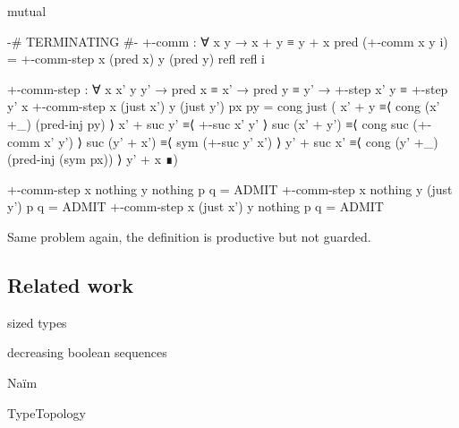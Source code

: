 \begin{code}[hide]
mutual
\end{code}
\begin{code}
  {-# TERMINATING #-}
  +-comm : ∀ x y → x + y ≡ y + x
  pred (+-comm x y i) =
    +-comm-step x (pred x) y (pred y) refl refl i

  +-comm-step :
    ∀ x x' y y' → pred x ≡ x' → pred y ≡ y' →
    +-step x' y ≡ +-step y' x
  +-comm-step x (just x') y (just y') px py =
    cong just
      ( x' + y         ≡⟨ cong (x' +_) (pred-inj py) ⟩
        x' + suc y'    ≡⟨ +-suc x' y' ⟩
        suc (x' + y')  ≡⟨ cong suc (+-comm x' y') ⟩
        suc (y' + x')  ≡⟨ sym (+-suc y' x') ⟩
        y' + suc x'    ≡⟨ cong (y' +_) (pred-inj (sym px)) ⟩
        y' + x         ∎)
\end{code}
\begin{code}[hide]
  +-comm-step x nothing y nothing p q = ADMIT
  +-comm-step x nothing y (just y') p q = ADMIT
  +-comm-step x (just x') y nothing p q = ADMIT
\end{code}

Same problem again, the definition is productive but not guarded.

\subsection{Related work}

sized types

decreasing boolean sequences

Naïm

TypeTopology
